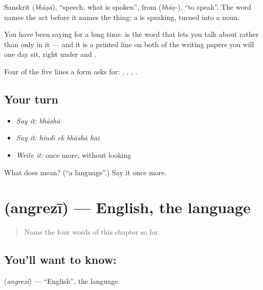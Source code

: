 Sanskrit  (\emph{bhāṣā}), \textquotedblleft{}speech, what is spoken\textquotedblright{}, from  (\emph{bhāṣ-}), \textquotedblleft{}to speak\textquotedblright{}. The word names the act before it names the thing: a  is speaking, turned into a noun.

You have been saying \textbf{   } for a long time.  is the word that lets you talk about  rather than only in it — and it is a printed line on both of the writing papers you will one day sit, right under  and .

\begin{grammarlens}[title={What you've built}]
Four of the five lines a form asks for: , , , .
\end{grammarlens}

\subsection*{Your turn}
\begin{itemize}
\raggedright
  \item \emph{Say it:} \emph{bhāshā}
  \item \emph{Say it:} \emph{hindī ek bhāshā hai}
  \item \emph{Write it:}  once more, without looking
\end{itemize}

\begin{tcolorbox}[breakable,colback=teal!4,colframe=teal!35!black,title={Before you move on}]
What does  mean? (\textquotedblleft{}a language\textquotedblright{}.) Say it once more.
\end{tcolorbox}
\section[angrezī]{ (angrezī) — English, the language}

\label{lesson:HI-C68-english}



\begin{quote}
Name the four words of this chapter so far.
\end{quote}

\subsection*{You'll want to know: }
\textbf{} (\emph{angrezī}) — \textquotedblleft{}English\textquotedblright{}, the language.

